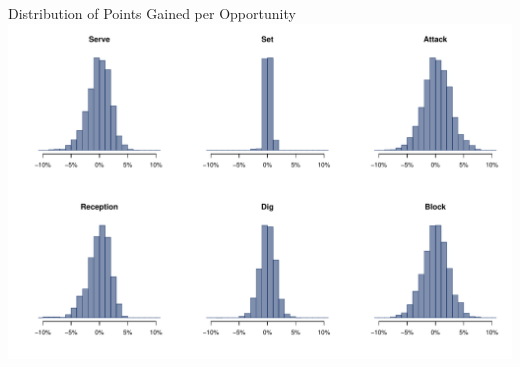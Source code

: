 \documentclass[handout]{beamer}
\begin{document}
\begin{frame}{Distribution of Points Gained per Opportunity}
  \includegraphics[width = \textwidth]{images/points_gained_per_opportunity.pdf}
\end{frame}
\end{document}
